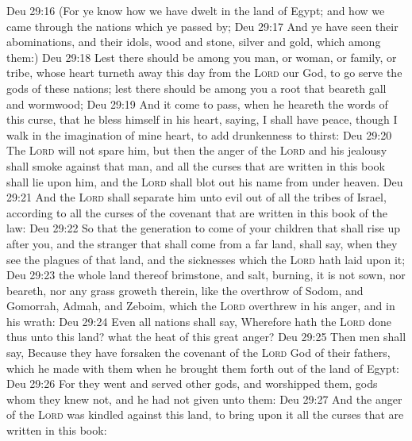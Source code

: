 \vs Deu 29:16 (For ye know how we have dwelt in the land of Egypt; and how we came through the nations which ye passed by;
\vs Deu 29:17 And ye have seen their abominations, and their idols, wood and stone, silver and gold, which  among them:)
\vs Deu 29:18 Lest there should be among you man, or woman, or family, or tribe, whose heart turneth away this day from the \textsc{Lord} our God, to go  serve the gods of these nations; lest there should be among you a root that beareth gall and wormwood;
\vs Deu 29:19 And it come to pass, when he heareth the words of this curse, that he bless himself in his heart, saying, I shall have peace, though I walk in the imagination of mine heart, to add drunkenness to thirst:
\vs Deu 29:20 The \textsc{Lord} will not spare him, but then the anger of the \textsc{Lord} and his jealousy shall smoke against that man, and all the curses that are written in this book shall lie upon him, and the \textsc{Lord} shall blot out his name from under heaven.
\vs Deu 29:21 And the \textsc{Lord} shall separate him unto evil out of all the tribes of Israel, according to all the curses of the covenant that are written in this book of the law:
\vs Deu 29:22 So that the generation to come of your children that shall rise up after you, and the stranger that shall come from a far land, shall say, when they see the plagues of that land, and the sicknesses which the \textsc{Lord} hath laid upon it;
\vs Deu 29:23  the whole land thereof  brimstone, and salt,  burning,  it is not sown, nor beareth, nor any grass groweth therein, like the overthrow of Sodom, and Gomorrah, Admah, and Zeboim, which the \textsc{Lord} overthrew in his anger, and in his wrath:
\vs Deu 29:24 Even all nations shall say, Wherefore hath the \textsc{Lord} done thus unto this land? what  the heat of this great anger?
\vs Deu 29:25 Then men shall say, Because they have forsaken the covenant of the \textsc{Lord} God of their fathers, which he made with them when he brought them forth out of the land of Egypt:
\vs Deu 29:26 For they went and served other gods, and worshipped them, gods whom they knew not, and  he had not given unto them:
\vs Deu 29:27 And the anger of the \textsc{Lord} was kindled against this land, to bring upon it all the curses that are written in this book:
